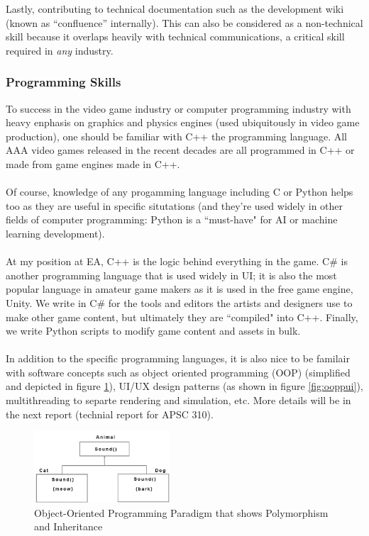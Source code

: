 \documentclass[10pt,letterpaper]{article}
\begin{document}
Lastly, contributing to technical documentation such as the development wiki (known as ``confluence'' internally). This can also be considered as a non-technical skill because it overlaps heavily with technical communications, a critical skill required in \textit{any} industry.\\

\subsubsection{Programming Skills}

To success in the video game industry or computer programming industry with heavy enphasis on graphics and physics engines (used ubiquitously in video game production), one should be familiar with C++ the programming language. All AAA video games released in the recent decades are all programmed in C++ or made from game engines made in C++.\\
\\
Of course, knowledge of any progamming language including C or Python helps too as they are useful in specific situtations (and they're used widely in other fields of computer programming: Python is a ``must-have" for AI or machine learning development).\\
\\
At my position at EA, C++ is the logic behind everything in the game. C\# is another programming language that is used widely in UI; it is also the most popular language in amateur game makers as it is used in the free game engine, Unity. We write in C\# for the tools and editors the artists and designers use to make other game content, but ultimately they are ``compiled" into C++. Finally, we write Python scripts to modify game content and assets in bulk.\\
\\
In addition to the specific programming languages, it is also nice to be familair with software concepts such as object oriented programming (OOP) (simplified and depicted in figure \ref{fig:oopp}), UI/UX design patterns (as shown in figure \ref{fig:ooppui}), multithreading to separte rendering and simulation, etc. More details will be in the next report (technial report for APSC 310).\\

\begin{figure}[H]
	\centering
	\includegraphics[width=0.45\textwidth]{assets/oopp}
	\caption{Object-Oriented Programming Paradigm that shows Polymorphism and Inheritance\cite{oopp}}
	\label{fig:oopp}
\end{figure}
\end{document}
